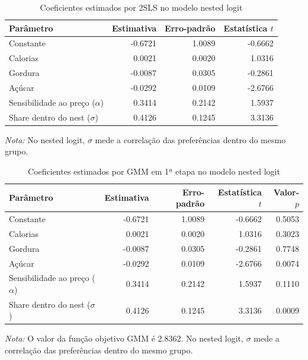 
\begingroup
\begin{table}[H]
\centering
\caption{Coeficientes estimados por 2SLS no modelo nested logit}
\label{tab:coef-nested-2sls}
\small
\begin{tabular}{lrrr}
\toprule
Parâmetro & Estimativa & Erro-padrão & Estatística $t$ \\
\midrule
Constante & -0.6721 & 1.0089 & -0.6662 \\
Calorias & 0.0021 & 0.0020 & 1.0316 \\
Gordura & -0.0087 & 0.0305 & -0.2861 \\
Açúcar & -0.0292 & 0.0109 & -2.6766 \\
Sensibilidade ao preço ($\alpha$) & 0.3414 & 0.2142 & 1.5937 \\
Share dentro do nest ($\sigma$) & 0.4126 & 0.1245 & 3.3136 \\
\bottomrule
\end{tabular}

\vspace{0.3em}
\footnotesize
\textit{Nota:} No nested logit, $\sigma$ mede a correlação das preferências dentro do mesmo grupo.
\end{table}
\endgroup


\begingroup
\begin{table}[H]
\centering
\caption{Coeficientes estimados por GMM em 1ª etapa no modelo nested logit}
\label{tab:coef-nested-gmm1}
\small
\begin{tabular}{lrrrr}
\toprule
Parâmetro & Estimativa & Erro-padrão & Estatística $t$ & Valor-$p$ \\
\midrule
Constante & -0.6721 & 1.0089 & -0.6662 & 0.5053 \\
Calorias & 0.0021 & 0.0020 & 1.0316 & 0.3023 \\
Gordura & -0.0087 & 0.0305 & -0.2861 & 0.7748 \\
Açúcar & -0.0292 & 0.0109 & -2.6766 & 0.0074 \\
Sensibilidade ao preço ($\alpha$) & 0.3414 & 0.2142 & 1.5937 & 0.1110 \\
Share dentro do nest ($\sigma$) & 0.4126 & 0.1245 & 3.3136 & 0.0009 \\
\bottomrule
\end{tabular}

\vspace{0.3em}
\footnotesize
\textit{Nota:} O valor da função objetivo GMM é $2.8362$. No nested logit, $\sigma$ mede a correlação das preferências dentro do mesmo grupo.
\end{table}
\endgroup


